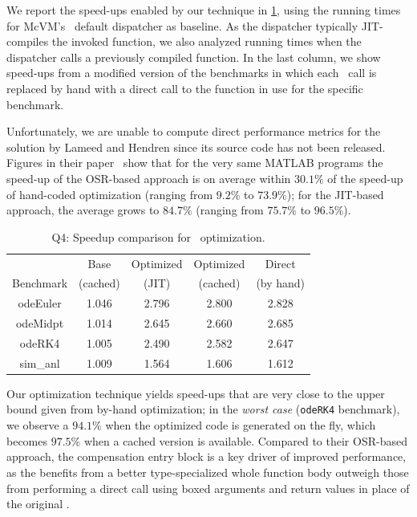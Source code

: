 {We report the speed-ups enabled by our technique in \mytable\ref{tab:CS-feval}, using the running times for McVM's \feval\ default dispatcher as baseline. As the dispatcher typically JIT-compiles the invoked function, we also analyzed running times when the dispatcher calls a previously compiled function. In the last column, we show speed-ups from a modified version of the benchmarks in which each \feval\ call is replaced by hand with a direct call to the function in use for the specific benchmark.

Unfortunately, we are unable to compute direct performance metrics for the solution by Lameed and Hendren since its source code has not been released. Figures in their paper~\cite{Lameed2013b} show that for the very same MATLAB programs the speed-up of the OSR-based approach is on average within $30.1\%$ of the speed-up of hand-coded optimization (ranging from $9.2\%$ to $73.9\%$); for the JIT-based approach, the average grows to $84.7\%$ (ranging from $75.7\%$ to $96.5\%$).

\begin{table}[ht!]
\begin{small}
\begin{tabular}{ |c|c|c|c|c| }
\cline{2-5}
\multicolumn{1}{c|}{} & Base & Optimized & Optimized & Direct \\ 
\cline{1-1}
Benchmark & (cached) & (JIT) & (cached) & (by hand) \\
\hline
\hline
odeEuler & 1.046 & 2.796 & 2.800 & 2.828 \\ 
\hline
odeMidpt & 1.014 & 2.645 & 2.660 & 2.685 \\ 
\hline
odeRK4 & 1.005 & 2.490 & 2.582 & 2.647 \\ 
\hline
sim\_anl & 1.009 & 1.564 & 1.606 & 1.612 \\ 
\hline
\end{tabular}
\vspace{2mm}
\caption{\label{tab:CS-feval} Q4: Speedup comparison for \feval\ optimization.} 
\vspace{-2mm}
\end{small}
\end{table}

Our optimization technique yields speed-ups that are very close to the upper bound given from by-hand optimization; in the {\em worst case} ({\tt odeRK4} benchmark), we observe a $94.1\%$ when the optimized code is generated on the fly, which becomes $97.5\%$ when a cached version is available. Compared to their OSR-based approach, the compensation entry block is a key driver of improved performance, as the benefits from a better type-specialized whole function body outweigh those from performing a direct call using boxed arguments and return values in place of the original \feval.

}

